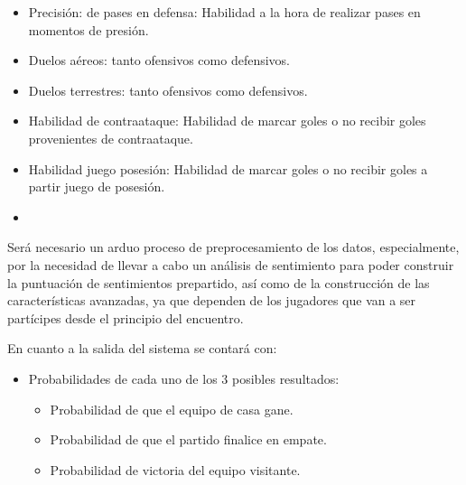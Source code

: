 \begin{enumerate}
\begin{itemize}
        \item Precisión: de pases en defensa: Habilidad a la hora de realizar pases en momentos de presión.
        \item Duelos aéreos: tanto ofensivos como defensivos.
        \item Duelos terrestres: tanto ofensivos como defensivos.
        \item Habilidad de contraataque: Habilidad de marcar goles o no recibir goles provenientes de contraataque.
        \item Habilidad juego posesión: Habilidad de marcar goles o no recibir goles a partir juego de posesión.
        \item 
    \end{itemize}
\end{enumerate}

Será necesario un arduo proceso de preprocesamiento de los datos, especialmente, por la necesidad de llevar a cabo un análisis de sentimiento para poder construir la puntuación de sentimientos prepartido, así como de la construcción de las características avanzadas, ya que dependen de los jugadores que van a ser partícipes desde el principio del encuentro.

En cuanto a la salida del sistema se contará con:

\begin{itemize}
    \item Probabilidades de cada uno de los 3 posibles resultados:
    \begin{itemize}
        \item Probabilidad de que el equipo de casa gane.
        \item Probabilidad de que el partido finalice en empate.
        \item Probabilidad de victoria del equipo visitante.
    \end{itemize}
\end{itemize}


